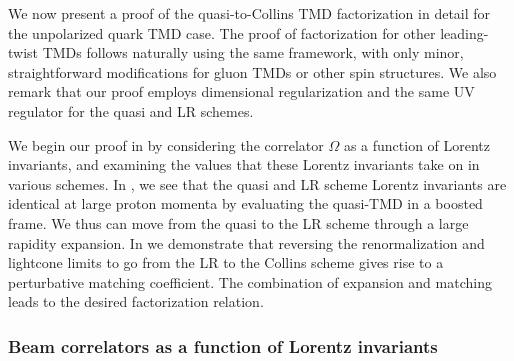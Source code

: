 \documentclass[11pt,a4paper]{article}
\newcommand{\Corr}{\Omega}
\begin{document}
We now present a proof of the quasi-to-Collins TMD factorization in detail for the unpolarized quark TMD case.
The proof of factorization for other leading-twist TMDs follows naturally using the same framework, with only minor, straightforward modifications for gluon TMDs or other spin structures. 
We also remark that our proof employs dimensional regularization and the same UV regulator for the quasi and LR schemes. 

We begin our proof in  by considering the correlator $\Corr$ as a function of Lorentz invariants, and examining the values that these Lorentz invariants take on in various schemes.
In , we see that the quasi and LR scheme Lorentz invariants are identical at large proton momenta by evaluating the quasi-TMD in a boosted frame.
We thus can move from the quasi to the LR scheme through a large rapidity expansion.
In  we demonstrate that reversing the renormalization and lightcone limits to go from the LR to the Collins scheme gives rise to a perturbative matching coefficient. 
The combination of expansion and matching leads to the desired factorization relation. 

\subsubsection{Beam correlators as a function of Lorentz invariants}
\label{sec:qTMD_Construction}
\end{document}
